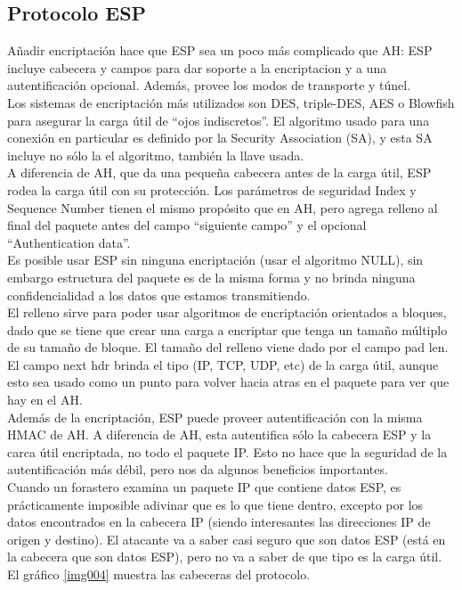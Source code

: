 \documentclass[a4paper,10pt]{article}
\begin{document}
		\subsection{Protocolo ESP}
	\indent Añadir encriptación hace que ESP sea un poco más complicado que AH: ESP incluye cabecera y campos para dar soporte a la encriptacion y a una autentificación opcional. Además, provee los modos de transporte y túnel. \\
	\indent Los sistemas de encriptaci\'on m\'as utilizados son DES, triple-DES, AES o Blowfish para asegurar la carga útil de “ojos indiscretos”. El algoritmo usado para una conexión en particular es definido por la Security Association (SA), y esta SA incluye no sólo la el algoritmo, también la llave usada. \\
	\indent A diferencia de AH, que da una pequeña cabecera antes de la carga útil, ESP rodea la carga útil con su protección. Los parámetros de seguridad Index y Sequence Number tienen el mismo propósito que en AH, pero agrega  relleno al final del paquete antes del campo “siguiente campo” y el opcional “Authentication data”. \\
	\indent Es posible usar ESP sin ninguna encriptación (usar el algoritmo NULL), sin embargo estructura del paquete es de la misma forma y no brinda ninguna confidencialidad a los datos que estamos transmitiendo. \\
	\indent El relleno sirve para poder usar algoritmos de encriptación orientados a bloques, dado que se tiene que crear una carga a encriptar que tenga un tamaño múltiplo de su tamaño de bloque. El tamaño del relleno viene dado por el campo pad len. El campo next hdr brinda el tipo (IP, TCP, UDP, etc) de la carga útil, aunque esto sea usado como un punto para volver hacia atras en el paquete para ver que hay en el AH. \\
	\indent Además de la encriptación, ESP puede proveer autentificación con la misma HMAC de AH. A diferencia de AH, esta autentifica sólo la cabecera ESP y la carca útil encriptada, no todo el paquete IP. Esto no hace que la seguridad de la autentificación más débil, pero nos da algunos beneficios importantes. \\
	\indent Cuando un forastero examina un paquete IP que contiene datos ESP, es prácticamente imposible adivinar que es lo que tiene dentro, excepto por los datos encontrados en la cabecera IP (siendo interesantes las direcciones IP de origen y destino). El atacante va a saber casi seguro que son datos ESP (está en la cabecera que son datos ESP), pero no va a saber de que tipo es la carga útil. El gr\'afico \ref{img004} muestra las cabeceras del protocolo.\\
\end{document}
